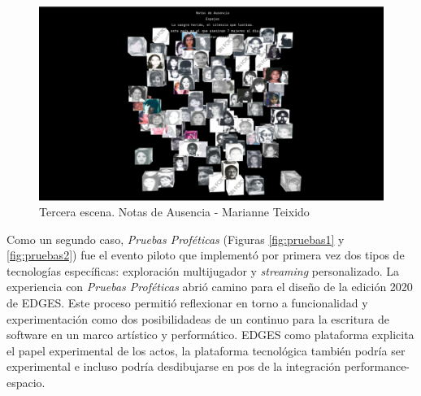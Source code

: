 \begin{figure}
  \includegraphics[width=\textwidth]{img/figura3.png}
  \caption{Tercera escena. Notas de Ausencia - Marianne Teixido}
  \label{fig:notas3}

\end{figure}





Como un segundo caso, \textit{Pruebas Proféticas} (Figuras \ref{fig:pruebas1} y \ref{fig:pruebas2}) fue el evento piloto que implementó por primera vez dos tipos de tecnologías específicas: exploración multijugador y \textit{streaming} personalizado. La experiencia con \textit{Pruebas Proféticas} abrió camino para el diseño de la edición 2020 de EDGES. Este proceso permitió reflexionar en torno a funcionalidad y experimentación como dos posibilidadeas de un continuo para la escritura de software en un marco artístico y performático. EDGES como plataforma explicita el papel experimental de los actos, la plataforma tecnológica también podría ser experimental e incluso podría desdibujarse en pos de la integración performance-espacio.


